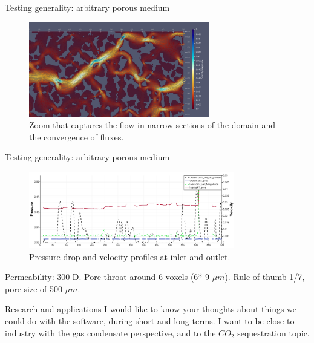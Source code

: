 \documentclass{beamer}
\begin{document}
	\begin{frame}{Testing generality: arbitrary porous medium}
		\begin{figure}
			\centering
			\includegraphics[width=0.7\textwidth]{pics/pmVelLowV2.png}
			\caption{Zoom that captures the flow in narrow sections of the domain and the convergence of fluxes.}   
		\end{figure}
	\end{frame}
	
	\begin{frame}{Testing generality: arbitrary porous medium}

			\begin{figure}
				\centering
				\includegraphics[width=0.8\textwidth]{pics/pmDrops.png}
				\caption{Pressure drop and velocity profiles at inlet and outlet.}   
			\end{figure}
			Permeability: 300 D. Pore throat around 6 voxels (6* 9 $\mu m$). Rule of thumb 1/7, pore size of 500 $\mu m$.
	\end{frame}
		
	\begin{frame}{Research and applications}
		I would like to know your thoughts about things we could do with the software, during short and long terms. I want to be close to industry with the gas condensate perspective, and to the $CO_2$ sequestration topic.
	\end{frame}
\end{document}
